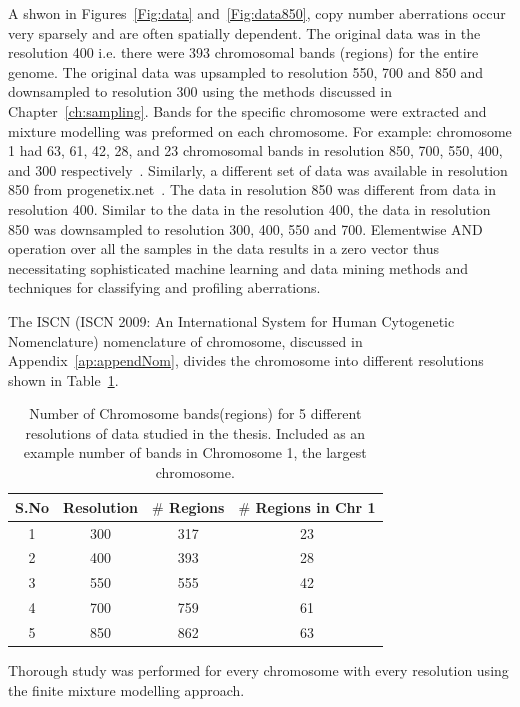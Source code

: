 A shwon in Figures~\ref{Fig:data} and~\ref{Fig:data850}, copy number aberrations occur very sparsely and are often spatially dependent. The original data was in the resolution 400 i.e. there were 393 chromosomal bands (regions) for the entire genome. The original data was upsampled to resolution 550, 700 and 850 and downsampled to resolution 300 using the methods discussed in Chapter~\ref{ch:sampling}. Bands for the specific chromosome were extracted and mixture modelling was preformed on each chromosome. For example: chromosome 1 had 63, 61, 42, 28, and 23 chromosomal bands in resolution 850, 700, 550, 400, and 300 respectively~\cite{iscn}. Similarly, a different set of data was available in resolution 850 from progenetix.net~\cite{progenetix}. The data in resolution 850 was different from data in resolution 400. Similar to the data in the resolution 400, the data in resolution 850 was downsampled to resolution 300, 400, 550 and 700. Elementwise AND operation over all the samples in the data results in a zero vector thus  necessitating sophisticated machine learning and data mining methods and techniques for classifying and profiling aberrations.

The ISCN (ISCN 2009: An International System for Human Cytogenetic Nomenclature) nomenclature of chromosome, discussed in Appendix~\ref{ap:appendNom}, divides the chromosome into different resolutions shown in Table~\ref{Tab:resolution}.
\begin{table}[h!]
  \centering
\begin{tabular}{ |c|c|c|c| }
\hline
  \textbf{S.No} &  \textbf{Resolution} &\textbf{$\#$ Regions} &\textbf{$\#$ Regions in Chr 1 } \\ \hline \hline
  1& 300 & 317 & 23\\ \hline
  2& 400 & 393 & 28\\ \hline
  3& 550 & 555 & 42\\ \hline
  4& 700 & 759 & 61 \\ \hline
  5& 850 & 862 & 63 \\ \hline
\end{tabular}
\caption[Chromosomal regions in different resolutions]{Number of Chromosome bands(regions) for 5 different resolutions of data studied in the thesis. Included as an example number of bands in Chromosome 1, the largest chromosome.}
\label{Tab:resolution}
\end{table}

Thorough study was performed for every chromosome with every resolution using the finite mixture modelling approach.

